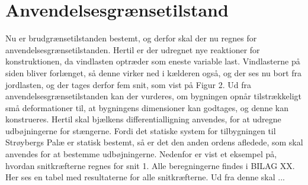 \chapter{Anvendelsesgrænsetilstand}
Nu er brudgrænsetilstanden bestemt, og derfor skal der nu regnes for anvendelsesgrænsetilstanden. Hertil er der udregnet nye reaktioner for konstruktionen, da vindlasten optræder som eneste variable last. Vindlasterne på siden bliver forlænget, så denne virker ned i kælderen også, og der ses nu bort fra jordlasten, og der tages derfor fem snit, som vist på Figur 2. Ud fra anvendelsesgrænsetilstanden kan der vurderes, om bygningen opnår tilstrækkeligt små deformationer til, at bygningens dimensioner kan godtages, og denne kan konstrueres. Hertil skal bjælkens differentialligning anvendes, for at udregne udbøjningerne for stængerne. Fordi det statiske system for tilbygningen til Strøybergs Palæ er statisk bestemt, så er det den anden ordens afledede, som skal anvendes for at bestemme udbøjningerne. 
\newline
\newline
Nedenfor er vist et eksempel på, hvordan snitkræfterne regnes for snit 1. Alle beregningerne findes i BILAG XX.
\newline
\newline
Her ses en tabel med resultaterne for alle snitkræfterne. Ud fra denne skal ...